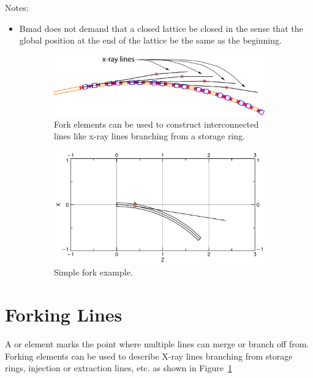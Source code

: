 \documentclass{hitec}
\newcommand{\Section}[1]{\section{#1}\vspace*{-1ex}}
\begin{document}
Notes:
\begin{itemize}
\item Bmad does not demand that a closed lattice be closed in the sense that the global position at the end of the lattice be the same as the beginning.
\end{itemize}


\begin{figure}[tb]
  \centering
  \begin{subfigure}[b]{0.48\textwidth}
    \includegraphics[width=\textwidth]{x-fork.pdf}
    \caption{Fork elements can be used to construct interconnected lines like x-ray lines branching
      from a storage ring.}
    \label{f:fork}
  \end{subfigure}
  \hfil
  \begin{subfigure}[b]{0.48\textwidth}
    \includegraphics[width=\textwidth]{fork-example.pdf}
    \caption{Simple fork example.}
    \label{f:fork.example}
  \end{subfigure}
  \caption{}
\end{figure}

\Section{Forking Lines}

A  or  element marks the point where multiple lines can merge or branch off from.
Forking elements can be used to describe X-ray lines branching from storage rings, injection or
extraction lines, etc. as shown in Figure~\ref{f:fork}
\end{document}

